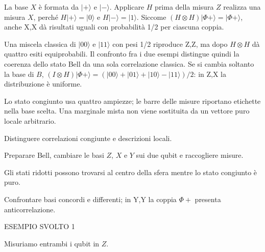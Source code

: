 La base \(X\) è formata da \(|+\rangle \) e \(|- \rangle \). Applicare \(H\) prima della misura \(Z\) realizza una misura \(X\), perché \(H|+\rangle =|0\rangle \) e \(H|- \rangle =|1\rangle \). Siccome \((H\otimes H)|\Phi +\rangle =|\Phi +\rangle \), anche X,X dà risultati uguali con probabilità 1/2 per ciascuna coppia.\par

Una miscela classica di \(|00\rangle \) e \(|11\rangle \) con pesi 1/2 riproduce Z,Z, ma dopo \(H\otimes H\) dà quattro esiti equiprobabili. Il confronto fra i due esempi distingue quindi la coerenza dello stato Bell da una sola correlazione classica. Se si cambia soltanto la base di \(B\), \((I\otimes H)|\Phi +\rangle =(|00\rangle +|01\rangle +|10\rangle - |11\rangle )/2\): in Z,X la distribuzione è uniforme.\par



Lo stato congiunto usa quattro ampiezze; le barre delle misure riportano etichette nella base scelta. Una marginale mista non viene sostituita da un vettore puro locale arbitrario.\par



Distinguere correlazioni congiunte e descrizioni locali.\par

Preparare Bell, cambiare le basi \(Z\), \(X\) e \(Y\) sui due qubit e raccogliere misure.\par

Gli stati ridotti possono trovarsi al centro della sfera mentre lo stato congiunto è puro.\par

Confrontare basi concordi e differenti; in Y,Y la coppia \(\Phi +\) presenta anticorrelazione.\par


\Needspace{.36\textheight}\label{c3-bell-example-1}
{\sffamily\small\color{Accent} ESEMPIO SVOLTO 1\par}
Misuriamo entrambi i qubit in \(Z\).\par


